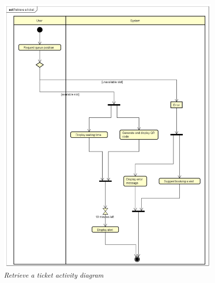 \documentclass[table, 12pt]{article}
\begin{document}
\begin{figure}[H]
    \centering
    \includegraphics[scale=0.4]{assets/Activity-Diagrams/act_retrieve.png}
    \caption{\textit{Retrieve a ticket activity diagram}}
\end{figure}
\end{document}
